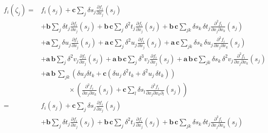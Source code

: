 \documentclass[11pt]{article}
\begin{document}
\begin{align*}
f_{i} \! \left( \zeta_{j} \right)
%
=&
f_{i} \! \left( s_{j} \right) + \mathbf{c} \sum_{j} \delta s_{j} 
\frac{ \partial f_{i} }{ \partial x_{j} } \! \left( s_{j} \right)
\\
&+ 
\mathbf{b} \sum_{j} \delta t_{j} \frac{ \partial f_{i} }{ \partial x_{j} } \! \left( s_{j} \right)
+ \mathbf{b} \, \mathbf{c} \sum_{j} \delta^{2} t_{j} 
\frac{ \partial f_{i} }{ \partial x_{j} } \! \left( s_{j} \right) 
+ \mathbf{b} \, \mathbf{c} \sum_{jk} \delta s_{k} \, \delta t_{j} 
\frac{ \partial^{2} f_{i} }{ \partial x_{j} \partial x_{k} } \! \left( s_{j} \right)
\\
&+ 
\mathbf{a} \sum_{j} \delta u_{j} \frac{ \partial f_{i} }{ \partial x_{j} } \! \left( s_{j} \right)
+ \mathbf{a} \, \mathbf{c} \sum_{j} \delta^{2} u_{j} 
\frac{ \partial f_{i} }{ \partial x_{j} } \! \left( s_{j} \right) 
+ \mathbf{a} \, \mathbf{c} \sum_{jk} \delta s_{k} \, \delta u_{j} 
\frac{ \partial^{2} f_{i} }{ \partial x_{j} \partial x_{k} } \! \left( s_{j} \right)
\\
&+ 
\mathbf{a} \, \mathbf{b} \sum_{j} \delta^{2} v_{j} 
\frac{ \partial f_{i} }{ \partial x_{j} } \! \left( s_{j} \right)
+ \mathbf{a} \, \mathbf{b} \, \mathbf{c} \sum_{j} \delta^{3} v_{j} 
\frac{ \partial f_{i} }{ \partial x_{j} } \! \left( s_{j} \right) 
+ \mathbf{a} \, \mathbf{b} \, \mathbf{c} \sum_{jk} \delta s_{k} \, \delta^{2} v_{j} 
\frac{ \partial^{2} f_{i} }{ \partial x_{j} \partial x_{k} } \! \left( s_{j} \right)
\\
&+ 
\mathbf{a} \, \mathbf{b} \, \sum_{jk} 
\left( \delta u_{j} \delta t_{k}
+ \mathbf{c} \left(
\delta u_{j} \, \delta^{2} t_{k} + \delta^{2} u_{j} \, \delta t_{k} 
\right) \right)
\\
& \quad\quad\quad\quad \times \left(
\frac{ \partial^{2} f_{i} }{ \partial x_{j} \partial x_{k} } \! \left( s_{j} \right) 
+ \mathbf{c} \sum_{l} \delta s_{l} 
\frac{ \partial^{3} f_{i} }{ \partial x_{j} \partial x_{k} \partial_{l} } \! \left( s_{j} \right)
\right)
\\
%
=&
f_{i} \! \left( s_{j} \right) + \mathbf{c} \sum_{j} \delta s_{j} 
\frac{ \partial f_{i} }{ \partial x_{j} } \! \left( s_{j} \right)
\\
&+ 
\mathbf{b} \sum_{j} \delta t_{j} \frac{ \partial f_{i} }{ \partial x_{j} } \! \left( s_{j} \right)
+ \mathbf{b} \, \mathbf{c} \sum_{j} \delta^{2} t_{j} 
\frac{ \partial f_{i} }{ \partial x_{j} } \! \left( s_{j} \right) 
+ \mathbf{b} \, \mathbf{c} \sum_{jk} \delta s_{k} \, \delta t_{j} 
\frac{ \partial^{2} f_{i} }{ \partial x_{j} \partial x_{k} } \! \left( s_{j} \right)

\end{align*}
\end{document}
